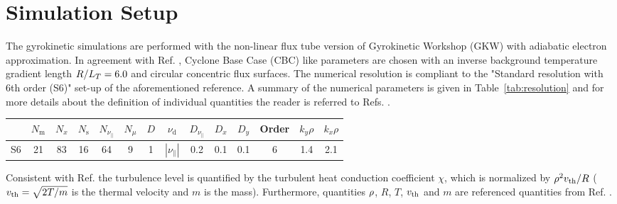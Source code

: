 \section{Simulation Setup}
\label{sec:simulation}

The gyrokinetic simulations are performed with the non-linear flux tube version of Gyrokinetic Workshop (GKW) \cite{Peeters2009} with adiabatic electron approximation. 
In agreement with Ref. , Cyclone Base Case (CBC) like parameters are chosen with an inverse background temperature gradient length $R/L_T = 6.0$ and circular concentric flux surfaces. 
The numerical resolution is compliant to the "Standard resolution with 6th order (S6)" set-up of the aforementioned reference. A summary of the numerical parameters is given in Table~\ref{tab:resolution} and for more details about the definition of individual quantities the reader is referred to Refs. .
\begin{center}
	\captionsetup{type=table}
	\begin{tabular}{l | ccccc | ccccc | c | cc}
		& $N_\mathrm{m}$ & $N_x$ & $N_\mathrm{s}$ & $N_{\nu_\parallel}$ & $N_\mu$ & $D$ & $\nu_\mathrm{d}$           & $D_{\nu_\parallel}$ & $D_x$ & $D_y$ & Order & $k_y\rho$ & $k_x\rho$ \\
		\hline
		S6   & 21    & 83    & 16    & 64                  & 9       & 1   & $|\nu_\parallel|$ & 0.2                 & 0.1   & 0.1   & 6     & 1.4       & 2.1       \\
	\end{tabular}
	\label{tab:resolutionBenchmark}
\end{center}

Consistent with Ref.  the turbulence level is quantified by the turbulent heat conduction coefficient $\chi$, which is normalized by $\rho^2 v_{\mathrm{th}}/R$ ($v_{\mathrm{th}} = \sqrt{2 T/m}$ is the thermal velocity and $m$ is the mass). Furthermore, quantities $\rho$, $R$, $T$, $v_{\mathrm{th}}$ and $m$ are referenced quantities from Ref. .